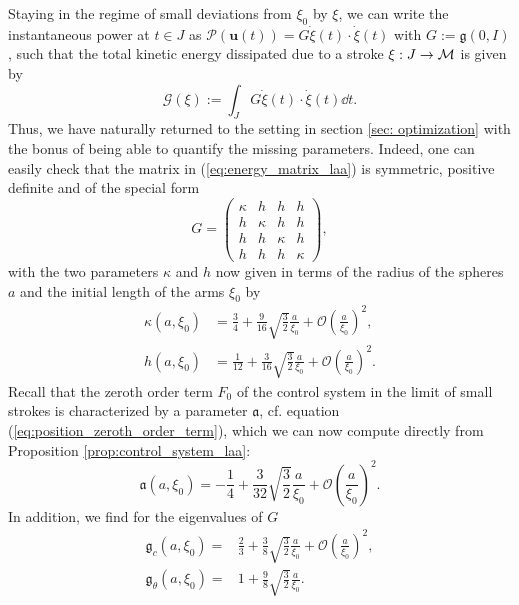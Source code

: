 Staying in the regime of small deviations from $\xi_0$ by $\xi$, we can write the instantaneous power at $t \in J$ as $\mathcal{P}(\boldsymbol u(t)) = G \dot{\xi}(t) \cdot \dot{\xi}(t)$ with $G := \mathfrak{g}(0, I)$, such that the total kinetic energy dissipated due to a stroke $\xi: J \to \mathcal{M}$ is given by
\begin{equation}
	\mathcal{G}(\xi) := \int_{J} G \dot{\xi}(t) \cdot \dot{\xi}(t) \dd t.
\end{equation}
Thus, we have naturally returned to the setting in section \ref{sec: optimization} with the bonus of being able to quantify the missing parameters. Indeed, one can easily check that the matrix in (\ref{eq:energy_matrix_laa}) is symmetric, positive definite and of the special form
\begin{equation}
G = \left ( \begin{array}{cccc}
\kappa & h & h & h \\ 
h & \kappa & h & h \\ 
h & h & \kappa & h \\ 
h & h & h & \kappa
\end{array} \right ),
\end{equation}
with the two parameters $\kappa$ and $h$ now given in terms of the radius of the spheres $a$ and the initial length of the arms $\xi_0$ by
\begin{eqnarray}
\kappa(a, \xi_0) &= \frac{3}{4} + \frac{9}{16} \sqrt{\frac{3}{2}} \frac{a}{\xi_0} + \mathcal{O}\left (\frac{a}{\xi_0}\right )^2,\\
h(a, \xi_0)  &= \frac{1}{12} + \frac{3}{16} \sqrt{\frac{3}{2}} \frac{a}{\xi_0} + \mathcal{O}\left (\frac{a}{\xi_0}\right )^2.
\end{eqnarray}
Recall that the zeroth order term $F_0$ of the control system in the limit of small strokes is characterized by a parameter $\mathfrak{a}$, cf. equation (\ref{eq:position_zeroth_order_term}), which we can now compute directly from Proposition \ref{prop:control_system_laa}:
\begin{equation}
\mathfrak{a}(a, \xi_0) = -\frac{1}{4} + \frac{3}{32} \sqrt{\frac{3}{2}} \frac{a}{\xi_0} + \mathcal{O}\left (\frac{a}{\xi_0}\right )^2.
\end{equation}
In addition, we find for the eigenvalues of $G$
\begin{eqnarray}
	\mathfrak{g}_c(a, \xi_0) =& \frac{2}{3} + \frac{3}{8} \sqrt{\frac{3}{2}} \frac{a}{\xi_0} + \mathcal{O}\left (\frac{a}{\xi_0}\right )^2,\\
	\mathfrak{g}_{\theta}(a, \xi_0) =& 1 + \frac{9}{8} \sqrt{\frac{3}{2}} \frac{a}{\xi_0}.
\end{eqnarray}


